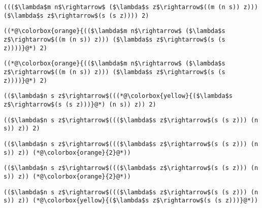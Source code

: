 \documentclass{beamer}
\begin{document}
\begin{frame}[fragile]{\CurrentSection}
\lstset{basicstyle=\ttfamily\small}\lstset{numbers=none}\lstset{language=ML}\begin{lstlisting}
((($\lambda$m n$\rightarrow$ ($\lambda$s z$\rightarrow$((m (n s)) z))) ($\lambda$s z$\rightarrow$(s (s z)))) 2)
\end{lstlisting}
\pause\lstset{language=ML}\begin{lstlisting}
((*@\colorbox{orange}{(($\lambda$m n$\rightarrow$ ($\lambda$s z$\rightarrow$((m (n s)) z))) ($\lambda$s z$\rightarrow$(s (s z))))}@*) 2)
\end{lstlisting}

\end{frame}

\begin{frame}[fragile]{\CurrentSection}
\lstset{basicstyle=\ttfamily\small}\lstset{numbers=none}\lstset{language=ML}\begin{lstlisting}
((*@\colorbox{orange}{(($\lambda$m n$\rightarrow$ ($\lambda$s z$\rightarrow$((m (n s)) z))) ($\lambda$s z$\rightarrow$(s (s z))))}@*) 2)
\end{lstlisting}
\pause\lstset{language=ML}\begin{lstlisting}
(($\lambda$n s z$\rightarrow$(((*@\colorbox{yellow}{($\lambda$s z$\rightarrow$(s (s z)))}@*) (n s)) z)) 2)
\end{lstlisting}

\end{frame}

\begin{frame}[fragile]{\CurrentSection}
\lstset{basicstyle=\ttfamily\small}\lstset{numbers=none}\lstset{language=ML}\begin{lstlisting}
(($\lambda$n s z$\rightarrow$((($\lambda$s z$\rightarrow$(s (s z))) (n s)) z)) 2)
\end{lstlisting}
\pause\lstset{language=ML}\begin{lstlisting}
(($\lambda$n s z$\rightarrow$((($\lambda$s z$\rightarrow$(s (s z))) (n s)) z)) (*@\colorbox{orange}{2}@*))
\end{lstlisting}

\end{frame}

\begin{frame}[fragile]{\CurrentSection}
\lstset{basicstyle=\ttfamily\small}\lstset{numbers=none}\lstset{language=ML}\begin{lstlisting}
(($\lambda$n s z$\rightarrow$((($\lambda$s z$\rightarrow$(s (s z))) (n s)) z)) (*@\colorbox{orange}{2}@*))
\end{lstlisting}
\pause\lstset{language=ML}\begin{lstlisting}
(($\lambda$n s z$\rightarrow$((($\lambda$s z$\rightarrow$(s (s z))) (n s)) z)) (*@\colorbox{yellow}{($\lambda$s z$\rightarrow$(s (s z)))}@*))
\end{lstlisting}

\end{frame}
\end{document}
